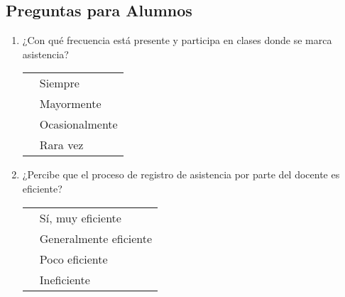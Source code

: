 \documentclass[12pt, a4paper]{article}
\newcommand{\checkbox}{\fbox{\rule{0pt}{1.5ex}\rule{1.5ex}{0pt}}}
\begin{document}
                                                                                \subsection*{Preguntas para Alumnos}

                                                                                \begin{enumerate}[label=\textbf{A\arabic*}.]
                                                                                \item ¿Con qué frecuencia está presente y participa en clases donde se marca asistencia?\\
                                                                                    \begin{tabular}{ll}
                                                                                    \checkbox & Siempre \\
                                                                                        \checkbox & Mayormente \\
                                                                                        \checkbox & Ocasionalmente \\
                                                                                        \checkbox & Rara vez \\
                                                                                        \end{tabular}

                                                                                        \item ¿Percibe que el proceso de registro de asistencia por parte del docente es eficiente?\\
                                                                                            \begin{tabular}{ll}
                                                                                            \checkbox & Sí, muy eficiente \\
                                                                                                \checkbox & Generalmente eficiente \\
                                                                                                \checkbox & Poco eficiente \\
                                                                                                \checkbox & Ineficiente \\
                                                                                                \end{tabular}


\end{enumerate}
\end{document}
